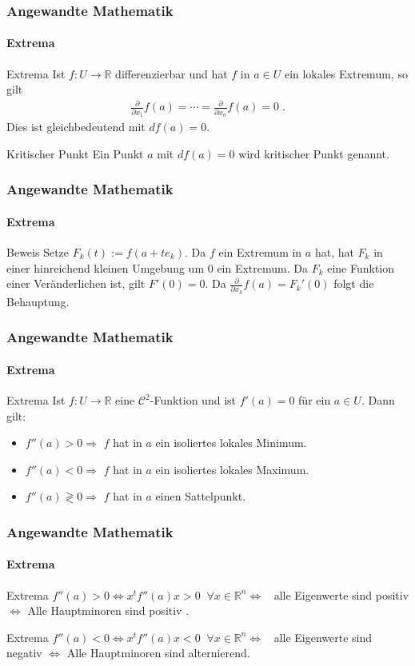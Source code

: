 \documentclass{beamer}
\begin{document}
\begin{frame}
    \frametitle{Angewandte Mathematik}
\framesubtitle{Extrema}
    \begin{block}{Extrema}
 Ist $f: U  \to \mathbb{R}$ differenzierbar und hat  $f$ in $a \in U$ ein lokales Extremum, so gilt 
\begin{align*}
\frac{\partial}{\partial x_{1}} f(a) = \cdots  = \frac{\partial}{\partial x_{n}} f(a) = 0 \;.
\end{align*}
Dies ist gleichbedeutend mit $df(a) = 0$.
\end{block}
    \begin{block}{Kritischer Punkt}
 Ein Punkt $a$ mit $df(a) = 0$ wird kritischer Punkt genannt.
\end{block}

 \end{frame}

\begin{frame}
    \frametitle{Angewandte Mathematik}
\framesubtitle{Extrema}
    \begin{block}{Beweis}
Setze $F_k(t) := f(a + t e_k)$. Da $f$ ein Extremum in $a$ hat, hat $F_k$ in einer hinreichend kleinen Umgebung um $0$ ein Extremum. 
Da $F_k$ eine Funktion einer Veränderlichen ist, gilt $F'(0) = 0$. Da $\frac{\partial}{\partial x_k} f(a) = F_k'(0)$ folgt die Behauptung.
\end{block}
 \end{frame}


\begin{frame}
    \frametitle{Angewandte Mathematik}
\framesubtitle{Extrema}
    \begin{block}{Extrema}
 Ist $f: U  \to \mathbb{R}$ eine $\mathcal{C}^2$-Funktion und ist $f'(a) = 0$ für ein $a \in U$. Dann gilt:
\begin{itemize}
\item $f''(a) > 0 \Rightarrow $ $f$ hat in $a$ ein isoliertes lokales Minimum.
\item $f''(a) < 0 \Rightarrow $ $f$ hat in $a$ ein isoliertes lokales Maximum.
\item $f''(a) \gtrless 0 \Rightarrow $ $f$ hat in $a$ einen Sattelpunkt.
\end{itemize} 
\end{block}
 \end{frame}


\begin{frame}
    \frametitle{Angewandte Mathematik}
\framesubtitle{Extrema}
    \begin{block}{Extrema}
$f''(a) > 0 \Leftrightarrow x^t f''(a) x > 0 \; \; \forall x \in \mathbb{R}^n \Leftrightarrow \; \; $ alle Eigenwerte sind positiv $\Leftrightarrow$ Alle Hauptminoren sind positiv . 
\end{block}
    \begin{block}{Extrema}
$f''(a) < 0 \Leftrightarrow x^t f''(a) x < 0 \; \; \forall x \in \mathbb{R}^n \Leftrightarrow \; \; $ alle Eigenwerte sind negativ $\Leftrightarrow$ Alle Hauptminoren sind alternierend. 
\end{block}
 \end{frame}
\end{document}
